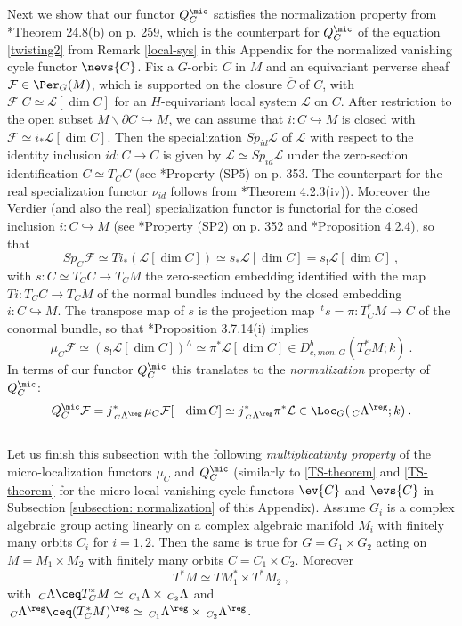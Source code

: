 \documentclass[11pt,letterpaper]{amsart}
\numberwithin{equation}{section}
\begin{document}
Next we show 
that our functor $Q^\mic_C$ satisfies the normalization property from \cite{ABV92}*{Theorem 24.8(b) on p. 259},
which is the counterpart for $Q^\mic_C$ of the equation \eqref{twisting2} from Remark \ref{local-sys} in this Appendix for the normalized vanishing cycle functor $\nevs{C}$. Fix a $G$-orbit $C$ in $M$ and an equivariant perverse sheaf $\mathcal{F}\in \Per_{G}(M)$, which is supported on the closure
$\overline{C}$ of $C$, with $\mathcal{F}|C \simeq \mathcal{L}[\dim C]$ for an $H$-equivariant local system $\mathcal{L}$ on $C$. After restriction to the open subset $M\backslash \partial C \hookrightarrow M$, we can assume that $i: C\hookrightarrow M$ is closed 
with $\mathcal{F}\simeq i_*\mathcal{L}[\dim C]$. Then the specialization $Sp_{id}\mathcal{L}$ of $\mathcal{L}$ with respect to the identity inclusion
$id: C\to C$ is given by $\mathcal{L} \simeq Sp_{id}\mathcal{L}$ under the zero-section identification $C\simeq T_CC$ (see \cite{Ver83}*{Property (SP5) on p. 353}. The counterpart for the real specialization functor $\nu_{id}$ follows from \cite{KaS94}*{Theorem 4.2.3(iv)}). 
Moreover the Verdier (and also the real) specialization functor is functorial for the closed inclusion $i: C\hookrightarrow M$
 (see \cite{Ver83}*{Property (SP2) on p. 352} and \cite{KaS94}*{Proposition 4.2.4}), so that 
$$Sp_C\mathcal{F}\simeq Ti_*(\mathcal{L}[\dim C]) \simeq s_*\mathcal{L}[\dim C] = s_!\mathcal{L}[\dim C]\:,$$
with $s: C\simeq T_CC\to T_CM$ the zero-section embedding identified with the map $Ti: T_CC\to T_CM$ of the normal bundles induced by the closed embedding $i: C\hookrightarrow M$. The transpose map of $s$ is the projection map $\,^ts=\pi: T^*_CM\to C$  of the conormal bundle,
so that \cite{KaS94}*{Proposition 3.7.14(i)} implies 
$$\mu_C \mathcal{F}  \simeq ( s_!\mathcal{L}[\dim C])^\wedge  \simeq \pi^*\mathcal{L}[\dim C] \in D^b_{c,mon,G}(T^*_CM;k)\:.$$
In terms of our functor $Q^\mic_C$ this translates to the {\it normalization} property of $Q^\mic_C$:
\begin{equation} \label{Qmic-normalization}
 Q^\mic_C  \mathcal{F} = j^*_{\,_C\Lambda^\reg}\,\mu_C  \mathcal{F} [-\dim C] \simeq j^*_{\,_C\Lambda^\reg}\pi^*\mathcal{L}\in \Loc_{G}(\,_C\Lambda^\reg;k) \:.
\end{equation}\\

Let us finish this subsection with the following {\it multiplicativity property} of the micro-localization functors $\mu_C$ and $Q^\mic_C$
(similarly to \eqref{TS-theorem} and \eqref{TS-theorem} for 
the micro-local vanishing cycle functors  $\ev{C}$ and $\evs{C}$ in Subsection \ref{subsection: normalization} of this Appendix).
Assume $G_i$  is a complex  algebraic group 
acting linearly on a complex algebraic manifold $M_i$ with finitely many orbits $C_i$ for $i=1,2$.
Then the same is true for $G=G_1\times G_2$ acting on
$M=M_1 \times M_2$ with finitely many orbits $C=C_1\times C_2$. Moreover
$$T^*M\simeq TM^*_1\times T^*M_2 \:,$$
with $\,_C\Lambda \ceq T^*_{C}M\simeq \,_{C_1}\Lambda\times \,_{C_2}\Lambda$ and
$\,_C\Lambda^\reg \ceq (T^*_{C}M)^\reg \simeq \,_{C_1}\Lambda^\reg\times \,_{C_2}\Lambda^\reg$.
\end{document}
